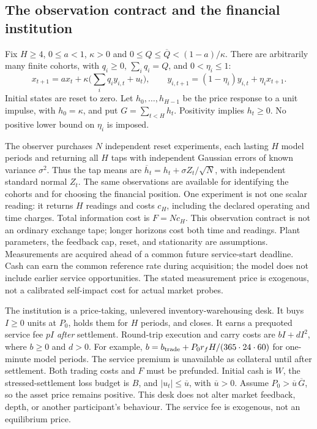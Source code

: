 \subsection*{The observation contract and the financial institution}
Fix $H\ge4$, $0\le a<1$, $\kappa>0$ and
$0\le Q\le\overline Q<(1-a)/\kappa$. There are arbitrarily many finite
cohorts, with $q_i\ge0$, $\sum_iq_i=Q$, and $0<\eta_i\le1$:
\[
 x_{t+1}=a x_t+\kappa\bigl(\sum_iq_i y_{i,t}+u_t\bigr),\qquad
 y_{i,t+1}=(1-\eta_i)y_{i,t}+\eta_i x_{t+1}.
\]
Initial states are reset to zero. Let $h_0,\ldots,h_{H-1}$ be the price
response to a unit impulse, with $h_0=\kappa$, and put
$G=\sum_{t<H}h_t$. Positivity implies $h_t\ge0$.
No positive lower bound on $\eta_i$ is imposed.

The observer purchases $N$ independent reset experiments, each lasting $H$
model periods and returning all $H$ taps with independent Gaussian errors of
known variance $\sigma^2$. Thus the tap means are
$\overline h_t=h_t+\sigma Z_t/\sqrt N$, with independent standard normal
$Z_t$. The same observations are available for identifying the cohorts and
for choosing the financial position. One experiment is not one scalar reading:
it returns $H$ readings and costs $c_H$, including the declared operating and
time charges. Total information cost is $F=Nc_H$. This observation contract
is not an ordinary exchange tape; longer horizons cost both time and readings.
Plant parameters, the feedback cap, reset, and stationarity are assumptions.
Measurements are acquired ahead of a common future service-start deadline.
Cash can earn the common reference rate during acquisition; the model does
not include earlier service opportunities. The stated measurement price is
exogenous, not a calibrated self-impact cost for actual market probes.

The institution is a price-taking, unlevered inventory-warehousing desk.
It buys $I\ge0$ units at $P_0$, holds them for $H$ periods, and closes.
It earns a prequoted service fee $pI$ \emph{after} settlement. Round-trip
execution and carry costs are $bI+dI^2$, where $b\ge0$ and $d>0$.
For example, $b=b_{\rm trade}+P_0 r_f H/(365\cdot24\cdot60)$ for
one-minute model periods. The service premium is unavailable as collateral
until after settlement. Both trading costs and $F$ must be prefunded.
Initial cash is $W$, the stressed-settlement loss budget is $B$, and
$|u_t|\le\overline u$, with $\overline u>0$. Assume
$P_0>\overline u\,\overline G$, so the asset price remains positive.
This desk does not alter market feedback, depth, or another participant's
behaviour. The service fee is exogenous, not an equilibrium price.

